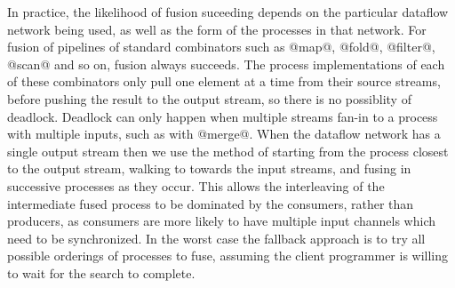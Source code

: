 In practice, the likelihood of fusion suceeding depends on the particular dataflow network being used, as well as the form of the processes in that network. For fusion of pipelines of standard combinators such as @map@, @fold@, @filter@, @scan@ and so on, fusion always succeeds. The process implementations of each of these combinators only pull one element at a time from their source streams, before pushing the result to the output stream, so there is no possiblity of deadlock. Deadlock can only happen when multiple streams fan-in to a process with multiple inputs, such as with @merge@. When the dataflow network has a single output stream then we use the method of starting from the process closest to the output stream, walking to towards the input streams, and fusing in successive processes as they occur. This allows the interleaving of the intermediate fused process to be dominated by the consumers, rather than producers, as consumers are more likely to have multiple input channels which need to be synchronized. In the worst case the fallback approach is to try all possible orderings of processes to fuse, assuming the client programmer is willing to wait for the search to complete. 








